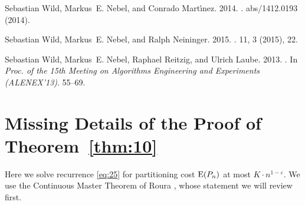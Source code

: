 \documentclass[prodmode,acmtalg]{acmsmall}
\newcommand{\E}{\textnormal{\textrm{E}}}
\begin{document}
\begin{thebibliography}{00}
{Sebastian Wild}, {Markus~E. Nebel}, {and} {Conrado Mart{\'{\i}}nez}. 2014.
\newblock {}.
  {abs/1412.0193} (2014).
\newblock


{Sebastian Wild}, {Markus~E. Nebel}, {and} {Ralph Neininger}. 2015.
\newblock {}.
 {11}, 3 (2015), 22.
\newblock


{Sebastian Wild}, {Markus~E. Nebel}, {Raphael Reitzig}, {and} {Ulrich Laube}.
  2013.
\newblock {}. In {\em Proc. of the 15th Meeting on Algorithms Engineering
  and Experiments ({ALENEX}'13)}. 55--69.
\newblock


\end{thebibliography}

\appendix

\section{Missing Details of the Proof of Theorem~\ref{thm:10}}\label{app:proof:thm:10}

Here we solve recurrence \eqref{eq:25} for partitioning cost $\E(P_n)$ at most $K \cdot n^{1-\varepsilon}$.
We use the Continuous Master Theorem of Roura \cite{Roura01}, whose 
statement we will review first.
\end{document}
